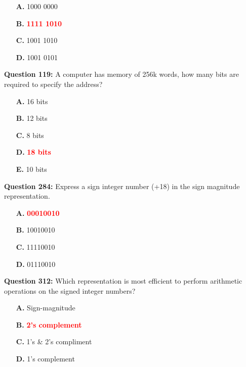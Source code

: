 \documentclass[12pt,a4paper]{article}
\begin{document}
\begin{itemize}
    \item[\textbf{A.}] 1000 0000
    \item[\textbf{B.}] \textcolor{red}{\textbf{1111 1010}}
    \item[\textbf{C.}] 1001 1010
    \item[\textbf{D.}] 1001 0101
\end{itemize}

\vspace{0.5cm}

\vspace{0.5cm}

\textbf{Question 119:} A computer has memory of 256k words, how many bits are required to specify the address?

\begin{itemize}
    \item[\textbf{A.}] 16 bits
    \item[\textbf{B.}] 12 bits
    \item[\textbf{C.}] 8 bits
    \item[\textbf{D.}] \textcolor{red}{\textbf{18 bits}}
    \item[\textbf{E.}] 10 bits
\end{itemize}

\vspace{0.5cm}

\vspace{0.5cm}

\textbf{Question 284:} Express a sign integer number (+18) in the sign magnitude representation.

\begin{itemize}
    \item[\textbf{A.}] \textcolor{red}{\textbf{00010010}}
    \item[\textbf{B.}] 10010010
    \item[\textbf{C.}] 11110010
    \item[\textbf{D.}] 01110010
\end{itemize}

\vspace{0.5cm}

\vspace{0.5cm}

\textbf{Question 312:} Which representation is most efficient to perform arithmetic operations on the signed integer numbers?

\begin{itemize}
    \item[\textbf{A.}] Sign-magnitude
    \item[\textbf{B.}] \textcolor{red}{\textbf{2's complement}}
    \item[\textbf{C.}] 1's \& 2's compliment
    \item[\textbf{D.}] 1's complement
\end{itemize}
\end{document}
